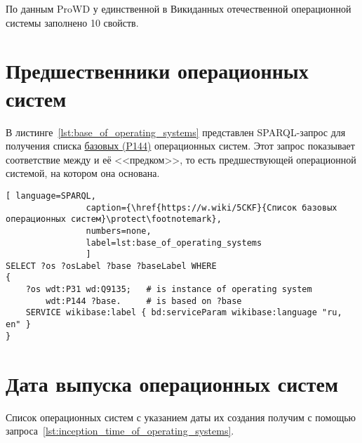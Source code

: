 По данным ProWD у единственной в Викиданных отечественной операционной системы 
 заполнено 10 свойств\autocite{prowd_os_link_ru}.




\section{Предшественники операционных систем}

В листинге~\ref{lst:base_of_operating_systems} представлен SPARQL-запрос для получения списка \href{https://www.wikidata.org/wiki/Property_talk:P144}{базовых (P144)} операционных систем. Этот запрос показывает соответствие между  и её <<предком>>, то есть предшествующей операционной системой, на котором она основана.


\begin{lstlisting}[ language=SPARQL, 
                caption={\href{https://w.wiki/5CKF}{Список базовых операционных систем}\protect\footnotemark},
                numbers=none,
                label=lst:base_of_operating_systems
                ]
SELECT ?os ?osLabel ?base ?baseLabel WHERE
{
    ?os wdt:P31 wd:Q9135;   # is instance of operating system
        wdt:P144 ?base.     # is based on ?base
    SERVICE wikibase:label { bd:serviceParam wikibase:language "ru, en" }
}
\end{lstlisting}




\section{Дата выпуска операционных систем}

Список операционных систем с указанием даты их создания 
получим с помощью запроса~\ref{lst:inception_time_of_operating_systems}.
%

